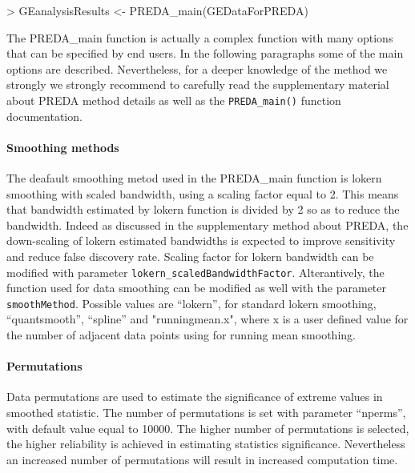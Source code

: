 \documentclass[a4paper,10pt]{article}
\begin{document}
\begin{Schunk}
\begin{Sinput}
> GEanalysisResults <- PREDA_main(GEDataForPREDA)
\end{Sinput}
\end{Schunk}


The PREDA\_main function is actually a complex function with many options that can be specified by end users. In the following paragraphs some of the main options are described. Nevertheless, for a deeper knowledge of the method we strongly we strongly recommend to carefully read the supplementary material about PREDA method details as well as the \texttt{PREDA\_main()} function documentation.



\paragraph{Smoothing methods}
The deafault smoothing metod used in the PREDA\_main function is lokern smoothing with scaled bandwidth, using a scaling factor equal to 2. This means that bandwidth estimated by lokern function is divided by 2 so as to reduce the bandwidth. Indeed as discussed in the supplementary method about PREDA, the down-scaling of lokern estimated bandwidths is expected to improve sensitivity and reduce false discovery rate. Scaling factor for lokern bandwidth can be modified with parameter \texttt{lokern\_scaledBandwidthFactor}. Alterantively, the function used for data smoothing can be modified as well with the parameter \texttt{smoothMethod}. Possible values are ``lokern'', for standard lokern smoothing, ``quantsmooth'', ``spline'' and "runningmean.x", where x is a user defined value for the number of adjacent data points using for running mean smoothing.


\paragraph{Permutations}
Data permutations are used to estimate the significance of extreme values in smoothed statistic. The number of permutations is set with parameter ``nperms'', with default value equal to 10000. The higher number of permutations is selected, the higher reliability is achieved in estimating statistics significance. Nevertheless an increased number of permutations will result in increased computation time.
\end{document}
